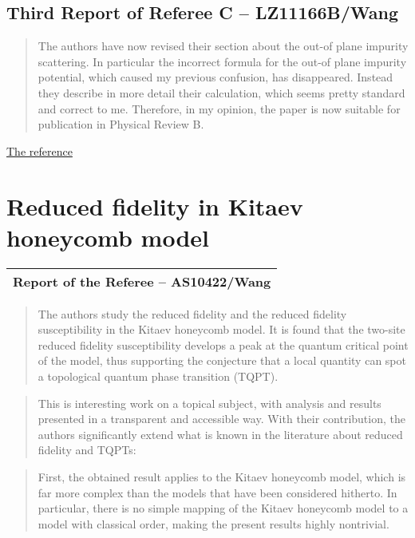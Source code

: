 \documentclass[11pt]{article}
\begin{document}
\hypertarget{third-report-of-referee-c-lz11166bwang}{%
\subsection{Third Report of Referee C --
LZ11166B/Wang}\label{third-report-of-referee-c-lz11166bwang}}

\begin{quote}
The authors have now revised their section about the out-of plane
impurity scattering. In particular the incorrect formula for the out-of
plane impurity potential, which caused my previous confusion, has
disappeared. Instead they describe in more detail their calculation,
which seems pretty standard and correct to me. Therefore, in my opinion,
the paper is now suitable for publication in Physical Review B.
\end{quote}

\href{https://en.wikipedia.org/wiki/Cooper_pair}{The reference}

    \hypertarget{reduced-fidelity-in-kitaev-honeycomb-model}{%
\section{Reduced fidelity in Kitaev honeycomb
model}\label{reduced-fidelity-in-kitaev-honeycomb-model}}

\begin{longtable}[]{@{}l@{}}
\toprule
\endhead
Report of the Referee -- AS10422/Wang\tabularnewline
\bottomrule
\end{longtable}

\begin{quote}
The authors study the reduced fidelity and the reduced fidelity
susceptibility in the Kitaev honeycomb model. It is found that the
two-site reduced fidelity susceptibility develops a peak at the quantum
critical point of the model, thus supporting the conjecture that a local
quantity can spot a topological quantum phase transition (TQPT).
\end{quote}

\begin{quote}
This is interesting work on a topical subject, with analysis and results
presented in a transparent and accessible way. With their contribution,
the authors significantly extend what is known in the literature about
reduced fidelity and TQPTs:
\end{quote}

\begin{quote}
First, the obtained result applies to the Kitaev honeycomb model, which
is far more complex than the models that have been considered hitherto.
In particular, there is no simple mapping of the Kitaev honeycomb model
to a model with classical order, making the present results highly
nontrivial.
\end{quote}
\end{document}
